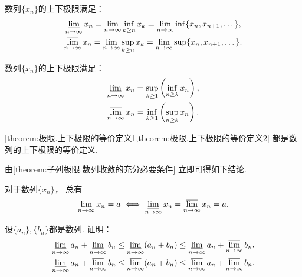 \begin{theorem}\label{theorem:极限.上下极限的等价定义1}
数列\(\{x_n\}\)的上下极限满足：\begin{gather*}
	\varliminf_{n\to\infty} x_n
	= \lim_{n\to\infty} \inf_{k\geq n} x_k
	= \lim_{n\to\infty} \inf\{x_n,x_{n+1},\dotsc\}, \\
	\varlimsup_{n\to\infty} x_n
	= \lim_{n\to\infty} \sup_{k\geq n} x_k
	= \lim_{n\to\infty} \sup\{x_n,x_{n+1},\dotsc\}.
\end{gather*}
\end{theorem}

\begin{theorem}\label{theorem:极限.上下极限的等价定义2}
数列\(\{x_n\}\)的上下极限满足：\begin{gather*}
	\varliminf_{n\to\infty} x_n
	= \sup_{k \geq 1} \left( \inf_{n \geq k} x_n \right), \\
	\varlimsup_{n\to\infty} x_n
	= \inf_{k \geq 1} \left( \sup_{n \geq k} x_n \right).
\end{gather*}
\end{theorem}

\cref{theorem:极限.上下极限的等价定义1,theorem:极限.上下极限的等价定义2}
都是数列的上下极限的等价定义.

由\cref{theorem:子列极限.数列收敛的充分必要条件} 立即可得如下结论.
\begin{corollary}
对于数列\(\{x_n\}\)，
总有\begin{equation*}
	\lim_{n\to\infty} x_n = a
	\iff
	\varliminf_{n\to\infty} x_n
	= \varlimsup_{n\to\infty} x_n
	= a.
\end{equation*}
\end{corollary}

\begin{example}
设\(\{a_n\},\{b_n\}\)都是数列.
证明：\begin{gather}
	\varliminf_{n\to\infty} a_n
	+ \varliminf_{n\to\infty} b_n
	\leq \varliminf_{n\to\infty} (a_n + b_n)
	\leq \varliminf_{n\to\infty} a_n
	+ \varlimsup_{n\to\infty} b_n. \\
	\varliminf_{n\to\infty} a_n
	+ \varlimsup_{n\to\infty} b_n
	\leq \varlimsup_{n\to\infty} (a_n + b_n)
	\leq \varlimsup_{n\to\infty} a_n
	+ \varlimsup_{n\to\infty} b_n.
\end{gather}
\end{example}

